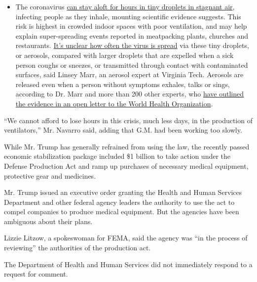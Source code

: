 \begin{itemize}
  \begin{itemize}
  \tightlist
  \item
    The coronavirus
    \href{https://www.nytimes.com/2020/07/04/health/239-experts-with-one-big-claim-the-coronavirus-is-airborne.html?action=click\&pgtype=Article\&state=default\&region=MAIN_CONTENT_3\&context=storylines_faq}{can
    stay aloft for hours in tiny droplets in stagnant air}, infecting
    people as they inhale, mounting scientific evidence suggests. This
    risk is highest in crowded indoor spaces with poor ventilation, and
    may help explain super-spreading events reported in meatpacking
    plants, churches and restaurants.
    \href{https://www.nytimes.com/2020/07/06/health/coronavirus-airborne-aerosols.html?action=click\&pgtype=Article\&state=default\&region=MAIN_CONTENT_3\&context=storylines_faq}{It's
    unclear how often the virus is spread} via these tiny droplets, or
    aerosols, compared with larger droplets that are expelled when a
    sick person coughs or sneezes, or transmitted through contact with
    contaminated surfaces, said Linsey Marr, an aerosol expert at
    Virginia Tech. Aerosols are released even when a person without
    symptoms exhales, talks or sings, according to Dr. Marr and more
    than 200 other experts, who
    \href{https://academic.oup.com/cid/article/doi/10.1093/cid/ciaa939/5867798}{have
    outlined the evidence in an open letter to the World Health
    Organization}.
  \end{itemize}
\end{itemize}

``We cannot afford to lose hours in this crisis, much less days, in the
production of ventilators,'' Mr. Navarro said, adding that G.M. had been
working too slowly.

While Mr. Trump has generally refrained from using the law, the recently
passed economic stabilization package included \$1 billion to take
action under the Defense Production Act and ramp up purchases of
necessary medical equipment, protective gear and medicines.

Mr. Trump issued an executive order granting the Health and Human
Services Department and other federal agency leaders the authority to
use the act to compel companies to produce medical equipment. But the
agencies have been ambiguous about their plans.

Lizzie Litzow, a spokeswoman for FEMA, said the agency was ``in the
process of reviewing'' the authorities of the production act.

The Department of Health and Human Services did not immediately respond
to a request for comment.

